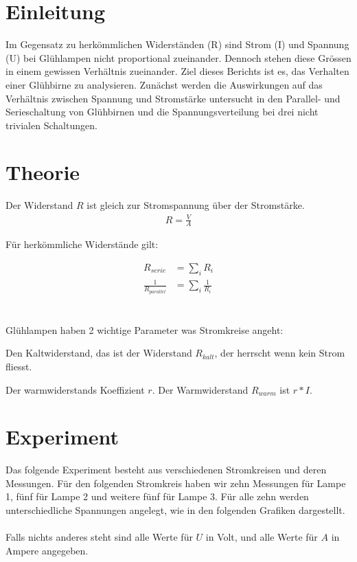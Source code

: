 \documentclass[12pt, a4paper, twoside]{article}
\begin{document}
\maketitlepage

\section{Einleitung}
Im Gegensatz zu herkömmlichen Widerständen (R) sind Strom (I) und Spannung (U) bei Glühlampen nicht proportional zueinander. Dennoch stehen diese Grössen in einem gewissen Verhältnis zueinander. Ziel dieses Berichts ist es, das Verhalten einer Glühbirne zu analysieren. Zunächst werden die Auswirkungen auf das Verhältnis zwischen Spannung und Stromstärke untersucht in den Parallel- und Serieschaltung von Glühbirnen und die Spannungsverteilung bei drei nicht trivialen Schaltungen.


\section{Theorie}
Der Widerstand $R$ ist gleich zur Stromspannung über der Stromstärke.
\begin{align*}
  R = \frac{V}{A}
\end{align*}

Für herkömmliche Widerstände gilt:

\begin{align*}
  R_{serie}              & = \sum_{i}R_i            \\
  \frac{1}{R_{parallel}} & = \sum_{i} \frac{1}{R_i}
\end{align*}
\cite{FoTa, S.176}
\\
\\
Glühlampen haben 2 wichtige Parameter was Stromkreise angeht:
\begin{list}{-}{}
  \item Den Kaltwiderstand, das ist der Widerstand $R_{kalt}$, der herrscht wenn kein Strom fliesst.
  \item Der warmwiderstands Koeffizient $r$. Der Warmwiderstand $R_{warm}$ ist $r * I$.
\end{list}
\section{Experiment}
Das folgende Experiment besteht aus verschiedenen Stromkreisen und deren Messungen. 
Für den folgenden Stromkreis haben wir zehn Messungen für Lampe 1, fünf für Lampe 2 und weitere fünf für Lampe 3. Für alle zehn werden unterschiedliche Spannungen angelegt, wie in den folgenden Grafiken dargestellt. \\
\\
Falls nichts anderes steht sind alle Werte für $U$ in Volt, und alle Werte für $A$ in Ampere angegeben.
\end{document}
